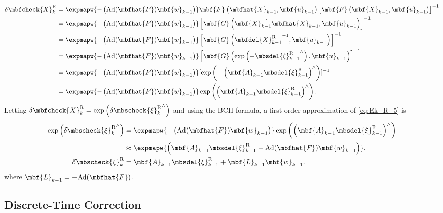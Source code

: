 \begin{align}
	\delta \mbfcheck{X}_k^\mathrm{R} & =\expmapw{-\left(\textrm{Ad}(\mbfhat{F})\mbf{w}_{k-1}\right)}\mbf{F}\left(\mbfhat{X}_{k-1},\mbf{u}_{k-1}\right)\left[\mbf{F}\left(\mbf{X}_{k-1},\mbf{u}_{k-1}\right)\right]^{-1} \notag \\
	& = \expmapw{-\left(\textrm{Ad}(\mbfhat{F})\mbf{w}_{k-1}\right)}\left[\mbf{G}\left(\mbf{X}_{k-1}^{-1}\mbfhat{X}_{k-1},\mbf{u}_{k-1}\right)\right]^{-1} \notag \\ 
	& = \expmapw{-\left(\textrm{Ad}(\mbfhat{F})\mbf{w}_{k-1}\right)}\left[\mbf{G}\left({\mbfdel{X}_{k-1}^\mathrm{R}}^{-1},\mbf{u}_{k-1}\right)\right]^{-1} \notag \\
	& = \expmapw{-\left(\textrm{Ad}(\mbfhat{F})\mbf{w}_{k-1}\right)}\left[\mbf{G}\left(\exp\left(-{\mbsdel{\xi}_{k-1}^\mathrm{R}}^\wedge\right),\mbf{u}_{k-1}\right)\right]^{-1} \notag \\ 
		& = \expmapw{-\left(\textrm{Ad}(\mbfhat{F})\mbf{w}_{k-1}\right)}[\exp\left(-\left(\mbf{A}_{k-1}\mbsdel{\xi}_{k-1}^\mathrm{R}\right)^\wedge\right)]^{-1}\notag \\ 
		& = \expmapw{-\left(\textrm{Ad}(\mbfhat{F})\mbf{w}_{k-1}\right)}\exp\left(\left(\mbf{A}_{k-1}\mbsdel{\xi}_{k-1}^\mathrm{R}\right)^\wedge\right). \label{eq:Ek_R_5}
\end{align}
Letting $\delta \mbfcheck{X}_k^\mathrm{R} = \exp\left(\delta {\mbscheck{\xi}_k^\mathrm{R}}^\wedge\right)$ and using the BCH formula, a first-order approximation of \eqref{eq:Ek_R_5} is
\begin{align}
	\exp\left({\delta \mbscheck{\xi}_k^\mathrm{R}}^\wedge\right) &= \expmapw{-\left(\textrm{Ad}(\mbfhat{F})\mbf{w}_{k-1}\right)}\exp\left(\left(\mbf{A}_{k-1}\mbsdel{\xi}_{k-1}^\mathrm{R}\right)^\wedge\right) \notag \\
	&\approx \expmapw{\left(\mbf{A}_{k-1}\mbsdel{\xi}_{k-1}^\mathrm{R} -  \textrm{Ad}(\mbfhat{F})\mbf{w}_{k-1}\right)}, \notag \\
	\delta \mbscheck{\xi}_k^\mathrm{R} & = \mbf{A}_{k-1}\mbsdel{\xi}_{k-1}^\mathrm{R} + \mbf{L}_{k-1}\mbf{w}_{k-1}. \notag
\end{align}
where $\mbf{L}_{k-1} = -\textrm{Ad}(\mbfhat{F})$.


\subsection{Discrete-Time Correction}

